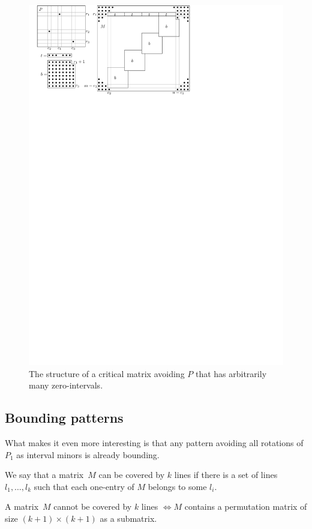 \begin{figure}[!ht]
\centering
\includegraphics[width=120mm]{img/manyints.pdf}
\caption{The structure of a critical matrix avoiding $P$ that has arbitrarily many zero-intervals.}
\label{fig:manyints}
\end{figure}

\subsection{Bounding patterns}
\label{subsec:bound}
What makes it even more interesting is that any pattern avoiding all rotations of $P_1$ as interval minors is already bounding.

\begin{defn}
We say that a matrix~$M$ can be covered by $k$ lines if there is a set of lines~$l_1,\dots,l_k$ such that each one-entry of $M$ belongs to some $l_i$.
\end{defn}

\begin{fct}
\label{fct:eger}
A matrix~$M$ cannot be covered by $k$ lines $\Leftrightarrow M$ contains a permutation matrix of size $(k+1)\times(k+1)$ as a submatrix.
\end{fct}

